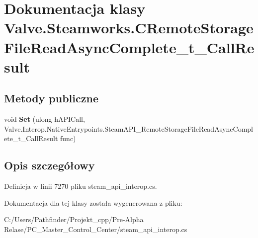 \hypertarget{class_valve_1_1_steamworks_1_1_c_remote_storage_file_read_async_complete__t___call_result}{}\section{Dokumentacja klasy Valve.\+Steamworks.\+C\+Remote\+Storage\+File\+Read\+Async\+Complete\+\_\+t\+\_\+\+Call\+Result}
\label{class_valve_1_1_steamworks_1_1_c_remote_storage_file_read_async_complete__t___call_result}
\subsection*{Metody publiczne}
\begin{DoxyCompactItemize}
\item 
\mbox{\label{class_valve_1_1_steamworks_1_1_c_remote_storage_file_read_async_complete__t___call_result_a980f27fbd584f9af37edf6bffc679367}} 
void {\bfseries Set} (ulong h\+A\+P\+I\+Call, Valve.\+Interop.\+Native\+Entrypoints.\+Steam\+A\+P\+I\+\_\+\+Remote\+Storage\+File\+Read\+Async\+Complete\+\_\+t\+\_\+\+Call\+Result func)
\end{DoxyCompactItemize}


\subsection{Opis szczegółowy}


Definicja w linii 7270 pliku steam\+\_\+api\+\_\+interop.\+cs.



Dokumentacja dla tej klasy została wygenerowana z pliku\+:\begin{DoxyCompactItemize}
\item 
C\+:/\+Users/\+Pathfinder/\+Projekt\+\_\+cpp/\+Pre-\/\+Alpha Relase/\+P\+C\+\_\+\+Master\+\_\+\+Control\+\_\+\+Center/steam\+\_\+api\+\_\+interop.\+cs\end{DoxyCompactItemize}
